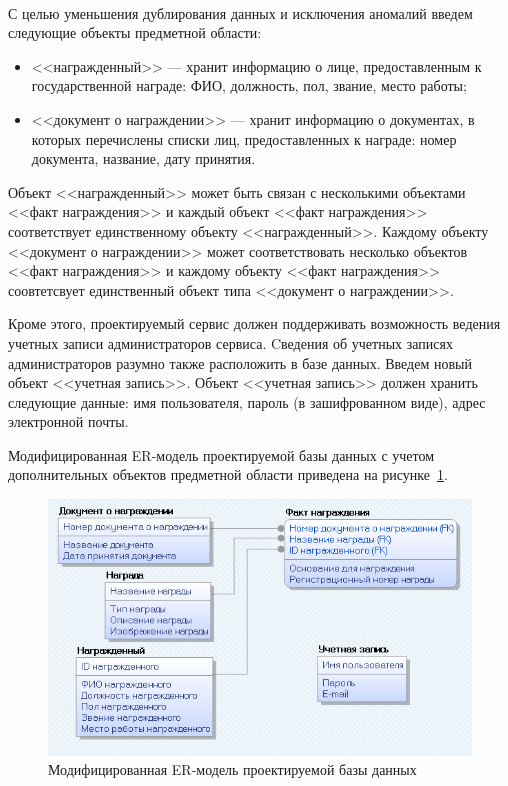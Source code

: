 \paragraph{}
С целью уменьшения дублирования данных и исключения аномалий введем
следующие объекты предметной области:

\begin{itemize}
\item <<награжденный>> --- хранит информацию о лице, предоставленным
  к государственной награде: ФИО, должность, пол, звание, место работы;
\item <<документ о награждении>> --- хранит информацию о документах,
  в которых перечислены списки лиц, предоставленных к награде: номер документа,
  название, дату принятия.
\end{itemize}

Объект <<награжденный>> может быть связан с несколькими
объектами <<факт награждения>> и каждый объект <<факт награждения>> 
соответствует единственному объекту <<награжденный>>.
Каждому объекту <<документ о награждении>> может соответствовать несколько
объектов <<факт награждения>> и каждому объекту <<факт награждения>> 
соовтетсвует единственный объект типа <<документ о награждении>>.

Кроме этого, проектируемый сервис должен поддерживать возможность ведения
учетных записи администраторов сервиса.
Cведения об учетных записях администраторов разумно также
расположить в базе данных. Введем новый объект <<учетная запись>>.
Объект <<учетная запись>> должен хранить следующие данные:
имя пользователя, пароль (в зашифрованном виде), адрес электронной почты.

Модифицированная ER-модель проектируемой базы данных с учетом
дополнительных объектов предметной области приведена на рисунке~\ref{fig:er_final}.

\begin{figure}[h]
  \centering
  \includegraphics[width=150mm]{pic/er_final.png}
  \caption{Модифицированная ER-модель проектируемой базы данных}
  \label{fig:er_final}
\end{figure}

